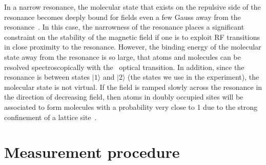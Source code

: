 In a narrow resonance, the molecular state that exists on the repulsive side of
the resonance becomes deeply bound for fields even a few Gauss away from the
resonance~\cite{Hazlett2012}.   In this case, the narrowness of the resonance
places a significant constraint on the stability of the magnetic field if one
is to exploit RF transitions in close proximity to the resonance.  However, the
binding energy of the molecular state away from the resonance is so large, that
atoms and molecules can be resolved spectroscopically with the \red\  optical
transition.  In addition, since the resonance is between states $|1\rangle$ and
$|2\rangle$ (the states we use in the experiment),  the molecular state is not
virtual.  If the field is ramped slowly across the resonance in the direction
of decreasing field, then atoms in doubly occupied sites will be associated to
form molecules with a probability very close to 1 due to the strong confinement
of a lattice site~\cite{Thalhammer2006}.  


\section{Measurement procedure} 

